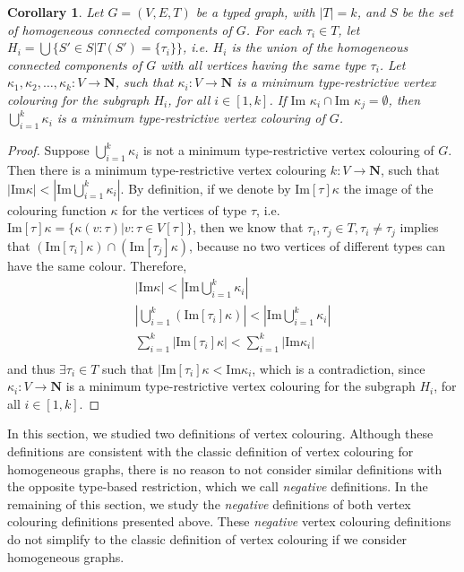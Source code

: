 \documentclass[preprint,12pt]{elsarticle}
\theoremstyle{plain}
\newtheorem{corollary}[theorem]{Corollary}
\newcommand\tyv[2]{#1\!\!:\!\!#2}
\newcommand{\Image}{\mathrm{Im}}
\begin{document}
\begin{corollary}
Let $G = (V,E,T)$ be a typed graph, with $|T| = k$,
and $S$ be the set of homogeneous connected components of $G$.
For each $\tau_i \in T$, let $H_i = \bigcup \{S'\in S| T(S') = \{\tau_i\}\}$,
i.e. $H_i$ is the union of the homogeneous connected components of $G$
with all vertices having the same type $\tau_i$.
Let $\kappa_1,\kappa_2,\ldots,\kappa_k:V\rightarrow\mathbf{N}$,
such that $\kappa_i:V\rightarrow\mathbf{N}$ is a minimum
type-restrictive vertex colouring for the subgraph $H_i$, for all $i\in[1,k]$.
If $\Image\,\,\kappa_i \cap \Image\,\,\kappa_j = \emptyset$,
then $\bigcup_{i=1}^k \kappa_i$ is a minimum
type-restrictive vertex colouring of $G$.
\end{corollary}
\begin{proof}
Suppose $\bigcup_{i=1}^k \kappa_i$ is not a minimum
type-restrictive vertex colouring of $G$.
Then there is a minimum
type-restrictive vertex colouring
$k:V\rightarrow\mathbf{N}$,
such that $|\Image \kappa| < |\Image \bigcup_{i=1}^k \kappa_i|$.
By definition,
if we denote by $\Image[\tau] \kappa$ the image of the colouring
function $\kappa$ for the vertices of type $\tau$,
i.e. $\Image[\tau] \kappa = \{\kappa(\tyv{v}{\tau})| \tyv{v}{\tau}\in V[\tau]\}$,
then we know that $\tau_i,\tau_j\in T, \tau_i\neq\tau_j$ implies that
$(\Image[\tau_i] \kappa)\cap(\Image[\tau_j] \kappa)$, because no two vertices
of different types can have the same colour.
Therefore,
\begin{equation*}
\begin{split}
|\Image \kappa| < |\Image \bigcup_{i=1}^k \kappa_i|\\
|\bigcup_{i=1}^k (\Image[\tau_i] \kappa)| < |\Image \bigcup_{i=1}^k \kappa_i|\\
\sum_{i=1}^k | \Image[\tau_i] \kappa| < \sum_{i=1}^k|\Image \kappa_i|\\
\end{split}
\end{equation*}
and thus
$\exists \tau_i\in T$ such that $| \Image[\tau_i] \kappa < \Image \kappa_i$,
which is a contradiction, since
$\kappa_i:V\rightarrow\mathbf{N}$ is a minimum
type-restrictive vertex colouring for the subgraph $H_i$, for all $i\in[1,k]$.
\end{proof}

In this section, we studied two definitions of vertex colouring.
Although these definitions are consistent with the classic
definition of vertex colouring for homogeneous graphs,
there is no reason to not consider similar
definitions with the opposite type-based restriction,
which we call \textit{negative} definitions.
In the remaining of this section,
we study the \textit{negative} definitions of both 
vertex colouring definitions presented above.
These \textit{negative} vertex colouring definitions
do not simplify to the classic definition of vertex
colouring if we consider homogeneous graphs.
\end{document}
